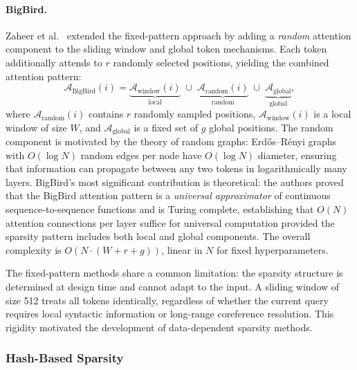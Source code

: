 \paragraph{BigBird.}
Zaheer et al.~\cite{zaheer2020big} extended the fixed-pattern approach by adding a \emph{random} attention component to the sliding window and global token mechanisms. Each token additionally attends to $r$ randomly selected positions, yielding the combined attention pattern:
\begin{equation}
\mathcal{A}_{\text{BigBird}}(i) = \underbrace{\mathcal{A}_{\text{window}}(i)}_{\text{local}} \;\cup\; \underbrace{\mathcal{A}_{\text{random}}(i)}_{\text{random}} \;\cup\; \underbrace{\mathcal{A}_{\text{global}}}_{\text{global}},
\label{eq:bigbird}
\end{equation}
where $\mathcal{A}_{\text{random}}(i)$ contains $r$ randomly sampled positions, $\mathcal{A}_{\text{window}}(i)$ is a local window of size $W$, and $\mathcal{A}_{\text{global}}$ is a fixed set of $g$ global positions. The random component is motivated by the theory of random graphs: Erd\H{o}s--R\'{e}nyi graphs with $O(\log N)$ random edges per node have $O(\log N)$ diameter, ensuring that information can propagate between any two tokens in logarithmically many layers. BigBird's most significant contribution is theoretical: the authors proved that the BigBird attention pattern is a \emph{universal approximator} of continuous sequence-to-sequence functions and is Turing complete, establishing that $O(N)$ attention connections per layer suffice for universal computation provided the sparsity pattern includes both local and global components. The overall complexity is $O(N \cdot (W + r + g))$, linear in $N$ for fixed hyperparameters.

The fixed-pattern methods share a common limitation: the sparsity structure is determined at design time and cannot adapt to the input. A sliding window of size 512 treats all tokens identically, regardless of whether the current query requires local syntactic information or long-range coreference resolution. This rigidity motivated the development of data-dependent sparsity methods.


\subsubsection{Hash-Based Sparsity}
\label{subsubsec:hash-sparsity}

